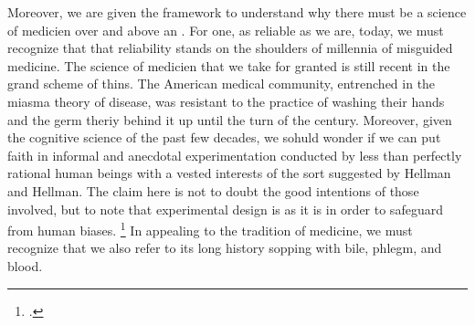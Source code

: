 \documentclass[letterpaper,notitlepage,12pt]{article}
\begin{document}
Moreover, we are given the framework to understand why there must be a science
of medicien over and above an .
For one, as reliable as we are, today, we must recognize that that reliability
stands on the shoulders of millennia of misguided medicine.
The science of medicien that we take for granted is still recent in the grand
scheme of thins.
The American medical community, entrenched in the miasma theory of disease, was
resistant to the practice of washing their hands and the germ theriy behind it
up until the turn of the  century.
Moreover, given the cognitive science of the past few decades, we sohuld wonder
if we can put faith in informal and anecdotal experimentation conducted by less
than perfectly rational human beings with a vested interests of the sort
suggested by Hellman and Hellman.
The claim here is not to doubt the good intentions of those involved, but to
note that experimental design is as it is in order to safeguard from human
biases.
\footcite[p. 352]{clifford_ethics_1886}
In appealing to the tradition of medicine, we must recognize that we also refer
to its long history sopping with bile, phlegm, and blood.
\end{document}
